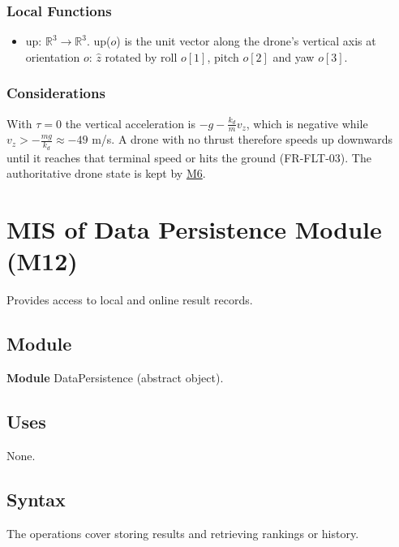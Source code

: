 \documentclass[12pt, titlepage]{article}
\newcommand{\Mref}[1]{\hyperref[sec:M#1]{M#1}}
\begin{document}
\subsubsection{Local Functions}

\begin{itemize}
\item up: $\mathbb{R}^3 \rightarrow \mathbb{R}^3$. up($o$) is the unit vector
  along the drone's vertical axis at orientation $o$: $\hat{z}$ rotated by roll
  $o[1]$, pitch $o[2]$ and yaw $o[3]$.
\end{itemize}

\subsubsection{Considerations}

With $\tau = 0$ the vertical acceleration is $-g - \frac{k_d}{m} v_z$, which is
negative while $v_z > -\frac{m g}{k_d} \approx -49$ m/s. A drone with no
thrust therefore speeds up downwards until it reaches that terminal speed or
hits the ground (FR-FLT-03). The authoritative drone state is kept by
\Mref{6}.

\newpage
\section{MIS of Data Persistence Module (M12)} \label{sec:M12}

Provides access to local and online result records.

\subsection{Module}

\textbf{Module} DataPersistence (abstract object).

\subsection{Uses}

None.

\subsection{Syntax}

The operations cover storing results and retrieving rankings or history.
\end{document}
